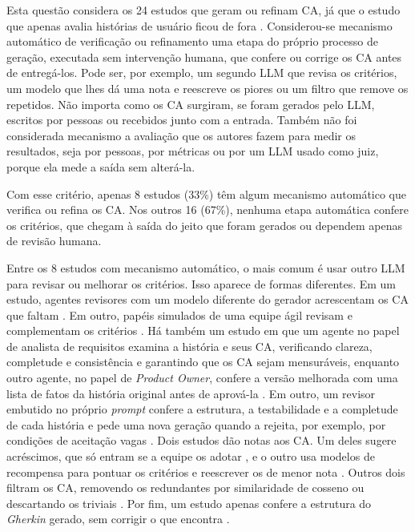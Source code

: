 Esta questão considera os 24 estudos que geram ou refinam CA, já que o estudo que apenas avalia histórias de usuário ficou de fora \cite{ma2026}. Considerou-se mecanismo automático de verificação ou refinamento uma etapa do próprio processo de geração, executada sem intervenção humana, que confere ou corrige os CA antes de entregá-los. Pode ser, por exemplo, um segundo LLM que revisa os critérios, um modelo que lhes dá uma nota e reescreve os piores ou um filtro que remove os repetidos. Não importa como os CA surgiram, se foram gerados pelo LLM, escritos por pessoas ou recebidos junto com a entrada. Também não foi considerada mecanismo a avaliação que os autores fazem para medir os resultados, seja por pessoas, por métricas ou por um LLM usado como juiz, porque ela mede a saída sem alterá-la.

Com esse critério, apenas 8 estudos (33\%) têm algum mecanismo automático que verifica ou refina os CA. Nos outros 16 (67\%), nenhuma etapa automática confere os critérios, que chegam à saída do jeito que foram gerados ou dependem apenas de revisão humana.

Entre os 8 estudos com mecanismo automático, o mais comum é usar outro LLM para revisar ou melhorar os critérios. Isso aparece de formas diferentes. Em um estudo, agentes revisores com um modelo diferente do gerador acrescentam os CA que faltam \cite{rotar2025}. Em outro, papéis simulados de uma equipe ágil revisam e complementam os critérios \cite{li2024}. Há também um estudo em que um agente no papel de analista de requisitos examina a história e seus CA, verificando clareza, completude e consistência e garantindo que os CA sejam mensuráveis, enquanto outro agente, no papel de \textit{Product Owner}, confere a versão melhorada com uma lista de fatos da história original antes de aprová-la \cite{zhang2024}. Em outro, um revisor embutido no próprio \textit{prompt} confere a estrutura, a testabilidade e a completude de cada história e pede uma nova geração quando a rejeita, por exemplo, por condições de aceitação vagas \cite{weerakoon2026}. Dois estudos dão notas aos CA. Um deles sugere acréscimos, que só entram se a equipe os adotar \cite{baker2026}, e o outro usa modelos de recompensa para pontuar os critérios e reescrever os de menor nota \cite{wang2025}. Outros dois filtram os CA, removendo os redundantes por similaridade de cosseno \cite{li2024} ou descartando os triviais \cite{schwedt2025}. Por fim, um estudo apenas confere a estrutura do \textit{Gherkin} gerado, sem corrigir o que encontra \cite{huang2026}.

